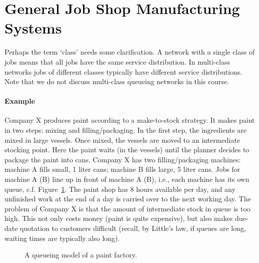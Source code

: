 

\section{General Job Shop Manufacturing Systems}
\label{sec:general-job-shop}

Perhaps the term `class' needs some clarification. A network with a
single class of jobs means that  all jobs have the same service
distribution. In multi-class networks jobs of different classes
typically have different service distributions. Note that we do not
discuss multi-class queueing networks in this course.


\paragraph{Example}

Company X produces paint according to a make-to-stock strategy. It
makes paint in two steps: mixing and filling/packaging. In the first
step, the ingredients are mixed in large vessels. Once mixed, the
vessels are moved to an intermediate stocking point. Here the paint
waits (in the vessels) until the planner decides to package the paint
into cans. Company X has two filling/packaging machines: machine A
fills small, 1 liter cans; machine B fills large, 5 liter cans. Jobs
for machine A (B) line up in front of machine A (B), i.e., each
machine has its own queue, c.f. Figure~\ref{fig:paint}. The paint shop
has 8 hours available per day, and any unfinished work at the end of a
day is carried over to the next working day. The problem of Company X
is that the amount of intermediate stock in queue is too high. This
not only costs money (paint is quite expensive), but also makes
due-date quotation to customers difficult (recall, by Little's law, if
queues are long, waiting times are typically also long).


\begin{figure}[ht]
    \centering
\caption{A queueing model of a paint factory.}
\label{fig:paint}
\end{figure}

